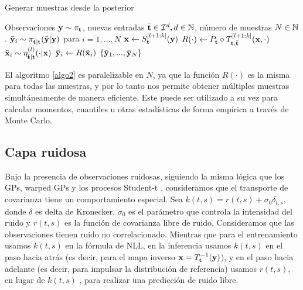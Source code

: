 \begin{algorithm}[!h]
	\caption{Generar muestras desde la posterior}
	\label{algo2}
	\begin{algorithmic} 
		\Require Observaciones \(\mathbf{y} \sim \pi_{\mathbf{t}}\), nuevas entradas \(\bar{\mathbf{t}} \in \mathcal{I}^d, d \in \mathbb{N}\), número de muestras \(N \in \mathbb{N}\).
		\Ensure  \(\bar{\mathbf{y}}_i \sim \pi_{\bar{\mathbf{t}}|\mathbf{t}}(\bar{\mathbf{y}}|\mathbf{y})\) para \(i=1,...,N\)
		\State \(\mathbf{x} \gets S_{\mathbf{t}}^{[l+1:k]}(\mathbf{y})\)
		\State \(R(\cdot) \gets P_{\bar{\mathbf{t}}} \circ T_{\mathbf{t},\bar{\mathbf{t}}}^{[l+1:k]}(\mathbf{x}, \cdot)\)
		\State \(\bar{\mathbf{x}}_i \sim \eta_{\bar{\mathbf{t}}|\mathbf{t}}^{(l)}(\cdot|\mathbf{x})\)
		\State \(\bar{\mathbf{y}}_i \leftarrow R(\bar{\mathbf{x}}_i)\)
		\EndFor
		\Return \(\{\bar{\mathbf{y}}_1,...,\bar{\mathbf{y}}_N\}\)
	\end{algorithmic}
\end{algorithm}

El algoritmo \ref{algo2} es paralelizable en \(N\), ya que la función \(R(\cdot)\) es la misma para todas las muestras, y por lo tanto nos permite obtener múltiples muestras simultáneamente de manera eficiente. Este puede ser utilizado a su vez para calcular momentos, cuantiles u otras estadísticas de forma empírica a través de Monte Carlo.

\subsection{Capa ruidosa}

Bajo la presencia de observaciones ruidosas, siguiendo la misma lógica que los GPs, warped GPs \cite{snelson2004warped} y los procesos Student-t \cite{shah2014student}, consideramos que el transporte de covarianza tiene un comportamiento especial. Sea \(k(t,s) = r(t,s) + \sigma_0\delta_{t,s}\), donde \(\delta\) es delta de Kronecker, \(\sigma_0\) es el parámetro que controla la intensidad del ruido y \(r(t,s)\) es la función de covarianza libre de ruido. Consideramos que las observaciones tienen ruido no correlacionado. Mientras que para el entrenamiento usamos \(k(t,s)\) en la fórmula de NLL, en la inferencia usamos \(k(t,s)\) en el paso hacia atrás (es decir, para el mapa inverso \(\mathbf{x} = T_{\mathbf{t} }^{-1}(\mathbf{y})\)), y en el paso hacia adelante (es decir, para impulsar la distribución de referencia) usamos \(r(t,s)\), en lugar de \(k(t,s)\) , para realizar una predicción de ruido libre.


